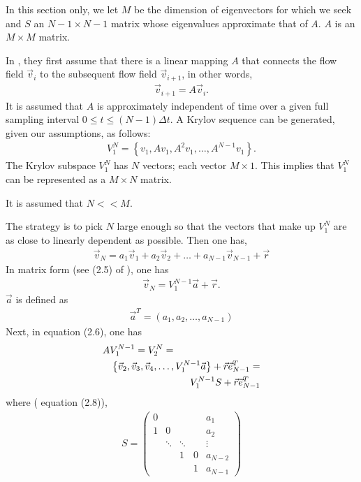 \documentclass[]{article}
\begin{document}
In this section only, 
we let $M$ be the dimension of eigenvectors for which we
seek and $S$ an $N-1\times N-1$ matrix whose eigenvalues approximate that of
$A$.  $A$ is an $M\times M$ matrix.
\par\noindent
In \cite{schmid2010dynamic}, they first assume that there is a linear mapping
$A$ that connects the flow field $\vec{v}_{i}$ to the subsequent flow field
$\vec{v}_{i+1}$, in other words,
\begin{eqnarray}
\vec{v}_{i+1}=A\vec{v}_{i}.
\end{eqnarray}
It is assumed that $A$ is approximately independent of time over a given
full sampling interval $0\le t\le (N-1)\Delta t$.  A Krylov sequence can
be generated, given our assumptions, as follows:
\begin{eqnarray}
V_{1}^{N}=\left\{ v_{1},Av_{1},A^{2}v_{1},\ldots,A^{N-1}v_{1} \right\}.
\end{eqnarray}
The Krylov subspace $V_{1}^{N}$ has $N$ vectors; each vector $M\times 1$.
This implies that $V_{1}^{N}$ can be represented as a $M\times N$ matrix.
\par\noindent
It is assumed that $N<<M$.
\par\noindent
The strategy is to pick $N$ large enough so that the vectors that make up
$V_{1}^{N}$ are as close to linearly dependent as possible.  Then one has,
\begin{eqnarray}
\vec{v}_{N}=a_{1}\vec{v}_{1}+a_{2}\vec{v}_{2}+\ldots+a_{N-1}\vec{v}_{N-1}+
  \vec{r}
\end{eqnarray}
In matrix form (see (2.5) of \cite{schmid2010dynamic}), one has
\begin{eqnarray}
\vec{v}_{N}=V_{1}^{N-1}\vec{a}+\vec{r}. \label{aequation}
\end{eqnarray}
$\vec{a}$ is defined as
\begin{eqnarray}
\vec{a}^{T}=(a_{1},a_{2},\ldots,a_{N-1})
\end{eqnarray}
Next, in \cite{schmid2010dynamic} equation (2.6), one has
\begin{eqnarray}
\lefteqn{ AV_{1}^{N-1}=V_{2}^{N}= } \\
& & \left\{\vec{v}_{2},\vec{v}_{3},\vec{v}_{4},\ldots,V_{1}^{N-1}\vec{a}
    \right\}+\vec{r}\vec{e}_{N-1}^{T}=  \nonumber \\
& & V_{1}^{N-1}S+\vec{r}\vec{e}_{N-1}^{T}
\end{eqnarray}
where (\cite{schmid2010dynamic} equation (2.8)),
\begin{eqnarray}
S=\left( \begin{array}{ccccc}
  0 &          &         &   & a_{1} \\
  1 & 0        &         &   & a_{2} \\
    & \ddots   & \ddots  &   & \vdots \\
    &          & 1       & 0 & a_{N-2} \\
    &          &         & 1 & a_{N-1} 
\end{array} \right) \label{Smatrix}
\end{eqnarray}
\end{document}
